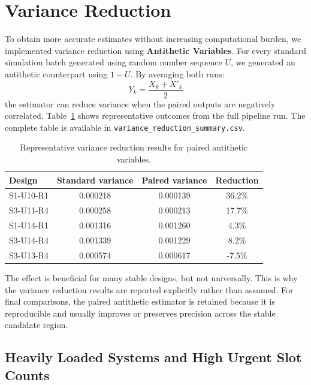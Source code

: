 \documentclass[12pt, a4paper]{article}
\newcommand{\headerrow}{\rowcolor{ugblue}\color{white}}
\newcommand{\altrow}{\rowcolor{rowgray}}
\begin{document}
\section{Variance Reduction}
\label{sec:variance}

To obtain more accurate estimates without increasing computational burden, we implemented variance reduction using \textbf{Antithetic Variables}. For every standard simulation batch generated using random number sequence $U$, we generated an antithetic counterpart using $1-U$. By averaging both runs:
\[
    Y_k = \frac{X_k + X'_k}{2}
\]
the estimator can reduce variance when the paired outputs are negatively correlated. Table~\ref{tab:variance_reduction} shows representative outcomes from the full pipeline run. The complete table is available in \texttt{variance\_reduction\_summary.csv}.

\begin{table}[ht]
\centering
\caption{Representative variance reduction results for paired antithetic variables.}
\label{tab:variance_reduction}
\small
\begin{tabular}{lccc}
\toprule
\headerrow \textbf{Design} & \textbf{Standard variance} & \textbf{Paired variance} & \textbf{Reduction} \\
\midrule
S1-U10-R1 & 0.000218 & 0.000139 & 36.2\% \\
\altrow S3-U11-R4 & 0.000258 & 0.000213 & 17.7\% \\
S1-U14-R1 & 0.001316 & 0.001260 & 4.3\% \\
\altrow S3-U14-R4 & 0.001339 & 0.001229 & 8.2\% \\
S3-U13-R4 & 0.000574 & 0.000617 & -7.5\% \\
\bottomrule
\end{tabular}
\end{table}

The effect is beneficial for many stable designs, but not universally. This is why the variance reduction results are reported explicitly rather than assumed. For final comparisons, the paired antithetic estimator is retained because it is reproducible and usually improves or preserves precision across the stable candidate region.

\subsection{Heavily Loaded Systems and High Urgent Slot Counts}
\end{document}
